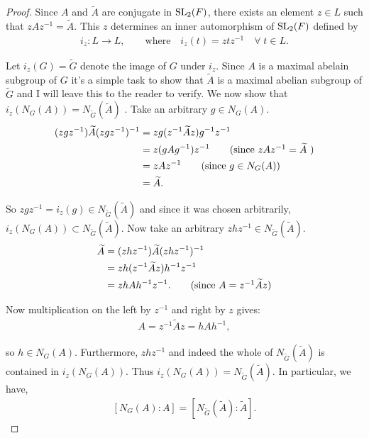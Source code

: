 \begin{footnotesize}
\begin{proof}
  Since $A$ and ${\widetilde{A}}$ are conjugate in $\operatorname{SL}_2(F)$, there exists an element $z \in L$ such that $zAz^{-1} = {\widetilde{A}}$. This $z$ determines an inner automorphism of $\operatorname{SL}_2(F)$ defined by
  \begin{align*} 
      i_z: L \longrightarrow L,  \qquad \text{where} \quad  i_z(t) = z t z^{-1}  \quad \forall \; t \in L.
  \end{align*}
  
  Let $i_z(G) = {\widetilde{G}}$ denote the image of $G$ under $i_z$. Since $A$ is a maximal abelain subgroup of $G$ it's a simple task to show that ${\widetilde{A}}$ is a maximal abelian subgroup of ${\widetilde{G}}$ and I will leave this to the reader to verify. We now show that $i_z(N_G(A)) = N_{\widetilde{G}}({\widetilde{A}})$ . Take an arbitrary $g \in N_G(A)$.
  \begin{align*} (z g z^{-1}) {\widetilde{A}} (z g z^{-1})^{-1} &= z g (z^{-1} {\widetilde{A}} z) g^{-1} z^{-1}
  \\ &=  z (g A g^{-1}) z^{-1} \tag{since $zAz^{-1} = {\widetilde{A}}$ }
  \\ &= z A z^{-1} \tag{since $g \in N_G(A)$}
  \\ &= {\widetilde{A}}.
  \end{align*}
  
  So $z g z^{-1} = i_z(g) \in N_{\widetilde{G}}({\widetilde{A}})$ and since it was chosen arbitrarily, $i_z(N_G(A)) \subset N_{\widetilde{G}}({\widetilde{A}})$. Now take an arbitrary $z h z^{-1} \in N_{\widetilde{G}}({\widetilde{A}})$.
  \begin{align*} {\widetilde{A}} &= (z h z^{-1}) {\widetilde{A}} (z h z^{-1})^{-1}
  \\ &= z h (z^{-1} {\widetilde{A}} z) h^{-1} z^{-1}
  \\ &= z h A h^{-1} z^{-1}. \tag{since $A = z^{-1} {\widetilde{A}} z$}
  \end{align*}
  
  Now multiplication on the left by $z^{-1}$ and right by $z$ gives:
  \begin{align*} A = z^{-1} {\widetilde{A}} z = h A h^{-1},
  \end{align*}
  
  so $h \in N_G(A)$. Furthermore, $z h z^{-1}$ and indeed the whole of $N_{\widetilde{G}}({\widetilde{A}})$ is contained in $i_z(N_G(A))$. Thus $ i_z(N_G(A)) = N_{\widetilde{G}}({\widetilde{A}})$. In particular, we have,
  \begin{align}\label{6.8iv1} [N_G(A): A] = [N_{\widetilde{G}}({\widetilde{A}}): {\widetilde{A}}].
  \end{align}
  

\end{proof}
\end{footnotesize}

